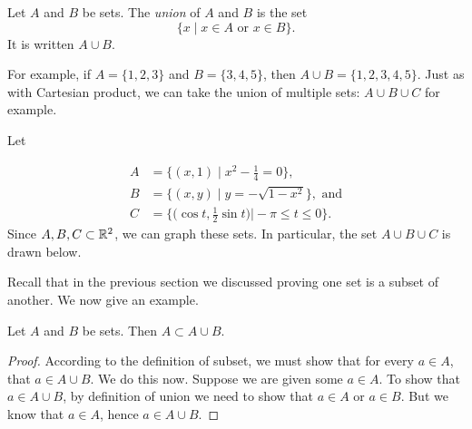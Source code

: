 \documentclass{tufte-book}
\begin{document}
\begin{definition}
  Let $A$ and $B$ be sets. The \emph{union} of $A$ and $B$ is the set
  \[
  \{x \mid x \in A \text{ or } x \in B\}.
  \]
  It is written $A \cup B$.
\end{definition}
For example, if $A = \{1, 2, 3\}$ and $B = \{3, 4, 5\}$, then $A \cup B = \{1, 2, 3, 4, 5\}$. Just as with Cartesian product, we can take the union of multiple sets: $A \cup B \cup C$ for example. 

\begin{example}
  Let 

\begin{align*}
A &= \bigg\{(x, 1) \mid x^2 - \frac14 = 0\bigg\},\\
B &= \{(x, y) \mid y = -\sqrt{1-x^2}\}, \text{ and}\\
C &= \bigg\{\bigg(\cos t, \frac12 \sin t\bigg) \bigg| -\pi \leq t \leq 0\bigg\}.
\end{align*}
Since $A, B, C \subset \mathbb{R}^2$, we can graph these sets. In particular, the set $A \cup B \cup C$ is drawn below.
    \begin{center}
  \end{center}

\end{example}

Recall that in the previous section we discussed proving one set is a subset of another. We now give an example.
\begin{proposition}
  Let $A$ and $B$ be sets. Then $A \subset A \cup B$.
\end{proposition}

\begin{proof}
  According to the definition of subset, we must show that for every $a \in A$, that $a \in A \cup B$. We do this now. Suppose we are given some $a \in A$. To show that $a \in A \cup B$, by definition of union we need to show that $a \in A$ or $a \in B$. But we know that $a \in A$, hence $a \in A \cup B$.
\end{proof}
\end{document}
